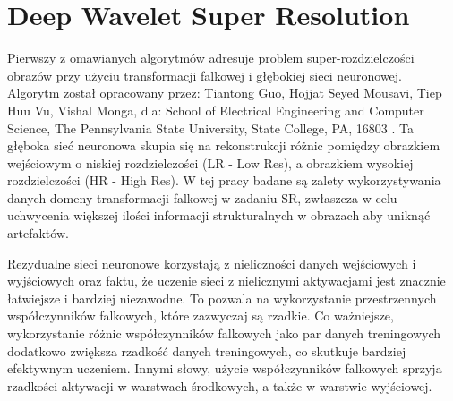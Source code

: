 \chapter{Deep Wavelet Super Resolution}


Pierwszy z omawianych algorytmów adresuje problem super-rozdzielczości obrazów przy użyciu transformacji falkowej i głębokiej sieci neuronowej. Algorytm został opracowany przez: Tiantong Guo, Hojjat Seyed Mousavi, Tiep Huu Vu, Vishal Monga, dla: School of Electrical Engineering and Computer Science, The Pennsylvania State University, State College, PA, 16803 \cite{guo2017deep}.
Ta głęboka sieć neuronowa skupia się na rekonstrukcji różnic pomiędzy obrazkiem wejściowym o niskiej rozdzielczości (LR - Low Res), a obrazkiem wysokiej rozdzielczości (HR - High Res). W tej pracy badane są zalety wykorzystywania danych domeny transformacji falkowej w zadaniu SR, zwłaszcza w celu uchwycenia większej ilości informacji strukturalnych w obrazach aby uniknąć artefaktów. 

Rezydualne sieci neuronowe korzystają z nieliczności danych wejściowych i wyjściowych oraz faktu, że uczenie sieci z nielicznymi aktywacjami jest znacznie łatwiejsze i bardziej niezawodne. 
To pozwala na wykorzystanie przestrzennych współczynników falkowych, które zazwyczaj są rzadkie. Co ważniejsze, wykorzystanie różnic współczynników falkowych jako par danych treningowych dodatkowo zwiększa rzadkość danych treningowych, co skutkuje bardziej efektywnym uczeniem. Innymi słowy, użycie współczynników falkowych sprzyja rzadkości aktywacji w warstwach środkowych, a także w warstwie wyjściowej.

